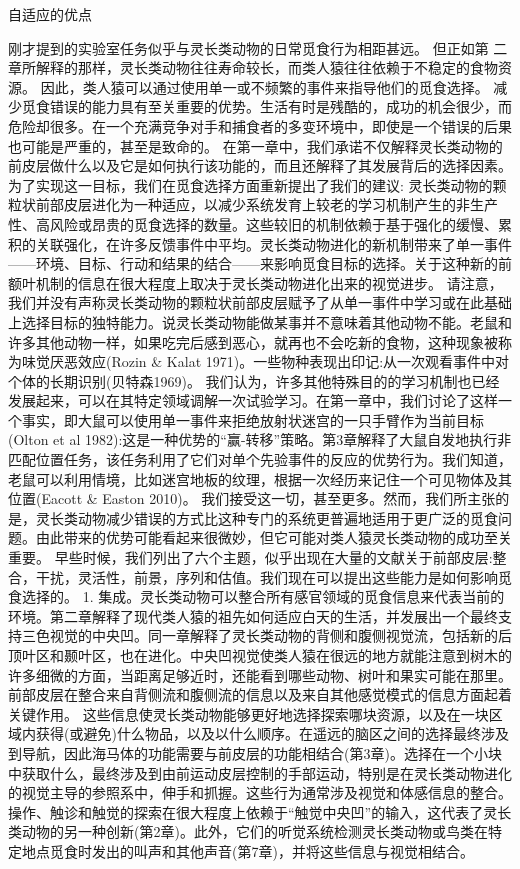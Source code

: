 自适应的优点

刚才提到的实验室任务似乎与灵长类动物的日常觅食行为相距甚远。
但正如第 二 章所解释的那样，灵长类动物往往寿命较长，而类人猿往往依赖于不稳定的食物资源。
因此，类人猿可以通过使用单一或不频繁的事件来指导他们的觅食选择。
减少觅食错误的能力具有至关重要的优势。生活有时是残酷的，成功的机会很少，而危险却很多。在一个充满竞争对手和捕食者的多变环境中，即使是一个错误的后果也可能是严重的，甚至是致命的。
在第一章中，我们承诺不仅解释灵长类动物的前皮层做什么以及它是如何执行该功能的，而且还解释了其发展背后的选择因素。为了实现这一目标，我们在觅食选择方面重新提出了我们的建议:
灵长类动物的颗粒状前部皮层进化为一种适应，以减少系统发育上较老的学习机制产生的非生产性、高风险或昂贵的觅食选择的数量。这些较旧的机制依赖于基于强化的缓慢、累积的关联强化，在许多反馈事件中平均。灵长类动物进化的新机制带来了单一事件——环境、目标、行动和结果的结合——来影响觅食目标的选择。关于这种新的前额叶机制的信息在很大程度上取决于灵长类动物进化出来的视觉进步。
请注意，我们并没有声称灵长类动物的颗粒状前部皮层赋予了从单一事件中学习或在此基础上选择目标的独特能力。说灵长类动物能做某事并不意味着其他动物不能。老鼠和许多其他动物一样，如果吃完后感到恶心，就再也不会吃新的食物，这种现象被称为味觉厌恶效应(Rozin \& Kalat 1971)。一些物种表现出印记:从一次观看事件中对个体的长期识别(贝特森1969)。
我们认为，许多其他特殊目的的学习机制也已经发展起来，可以在其特定领域调解一次试验学习。在第一章中，我们讨论了这样一个事实，即大鼠可以使用单一事件来拒绝放射状迷宫的一只手臂作为当前目标(Olton et al 1982):这是一种优势的“赢-转移”策略。第3章解释了大鼠自发地执行非匹配位置任务，该任务利用了它们对单个先验事件的反应的优势行为。我们知道，老鼠可以利用情境，比如迷宫地板的纹理，根据一次经历来记住一个可见物体及其位置(Eacott \& Easton 2010)。
我们接受这一切，甚至更多。然而，我们所主张的是，灵长类动物减少错误的方式比这种专门的系统更普遍地适用于更广泛的觅食问题。由此带来的优势可能看起来很微妙，但它可能对类人猿灵长类动物的成功至关重要。
早些时候，我们列出了六个主题，似乎出现在大量的文献关于前部皮层:整合，干扰，灵活性，前景，序列和估值。我们现在可以提出这些能力是如何影响觅食选择的。
1. 集成。灵长类动物可以整合所有感官领域的觅食信息来代表当前的环境。第二章解释了现代类人猿的祖先如何适应白天的生活，并发展出一个最终支持三色视觉的中央凹。同一章解释了灵长类动物的背侧和腹侧视觉流，包括新的后顶叶区和颞叶区，也在进化。中央凹视觉使类人猿在很远的地方就能注意到树木的许多细微的方面，当距离足够近时，还能看到哪些动物、树叶和果实可能在那里。前部皮层在整合来自背侧流和腹侧流的信息以及来自其他感觉模式的信息方面起着关键作用。
这些信息使灵长类动物能够更好地选择探索哪块资源，以及在一块区域内获得(或避免)什么物品，以及以什么顺序。在遥远的脑区之间的选择最终涉及到导航，因此海马体的功能需要与前皮层的功能相结合(第3章)。选择在一个小块中获取什么，最终涉及到由前运动皮层控制的手部运动，特别是在灵长类动物进化的视觉主导的参照系中，伸手和抓握。这些行为通常涉及视觉和体感信息的整合。操作、触诊和触觉的探索在很大程度上依赖于“触觉中央凹”的输入，这代表了灵长类动物的另一种创新(第2章)。此外，它们的听觉系统检测灵长类动物或鸟类在特定地点觅食时发出的叫声和其他声音(第7章)，并将这些信息与视觉相结合。
